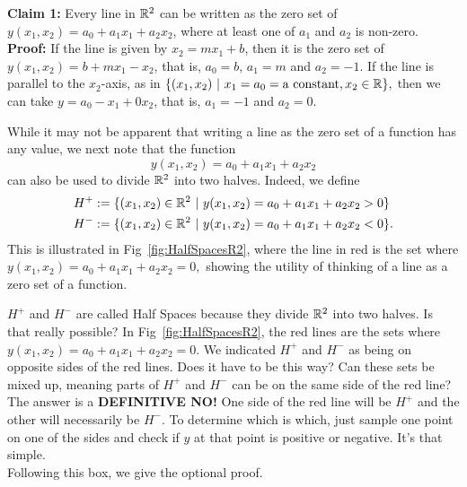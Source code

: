 
\textbf{Claim 1:} Every line in $\mathbb R^2$ can be written as the zero set of $y(x_1,x_2)=a_0 + a_1 x_1 + a_2 x_2$, where at least one of $a_1$ and $a_2$ is non-zero.\\

\textbf{Proof:} If the line is given by $x_2 = m x_1 + b$, then it is the zero set of $y(x_1,x_2)=b+m x_1 - x_2$, that is, $a_0=b$, $a_1=m$ and $a_2=-1.$ If the line is parallel to the $x_2$-axis, as in $ \{(x_1, x_2)~|~ x_1=a_0 = \text{a constant}, x_2 \in \mathbb R  \},$ 
then we can take  $y=a_0 - x_1 + 0 x_2$, that is,  $a_1=-1$ and $a_2=0.$
\Qed

\vspace*{0.2cm}

While it may not be apparent that writing a line as the zero set of a function has any value, we next note that the function  
$$y(x_1,x_2)=a_0 + a_1 x_1 + a_2 x_2$$
can also be used to divide $\mathbb R^2$ into two halves. Indeed, we define
\begin{align*}
H^+&:=\{(x_1, x_2) \in \mathbb R^2~|~ y(x_1,x_2) = a_0 + a_1 x_1 + a_2 x_2 >0\}\\
 H^-&:=\{(x_1, x_2) \in \mathbb R^2~|~ y(x_1,x_2) = a_0 + a_1 x_1 + a_2 x_2 <0\}.
\end{align*}
This is illustrated in Fig~\ref{fig:HalfSpacesR2}, where the line in red is the set where $y(x_1,x_2) = a_0 + a_1 x_1 + a_2 x_2 =0,$ showing the utility of thinking of a line as a zero set of a function.\\

\vspace*{.2cm}
\begin{tcolorbox}[sharp corners, colback=green!30, colframe=green!80!blue,title=\textbf{$H^+$ and $H^-$ are Called Half Spaces}]
$H^+$ and $H^-$ are called Half Spaces because they divide $\mathbb R^2$ into two halves. Is that really possible? In Fig~\ref{fig:HalfSpacesR2}, the red lines are the sets where $y(x_1,x_2) = a_0 + a_1 x_1 + a_2 x_2 =0$. We indicated $H^+$ and $H^-$ as being on opposite sides of the red lines. Does it have to be this way? Can these sets be mixed up, meaning parts of $H^+$ and $H^-$ can be on the same side of the red line? The answer is a \textbf{DEFINITIVE NO!} One side of the red line will be $H^+$ and the other will necessarily be $H^-$. To determine which is which, just sample one point on one of the sides and check if $y$ at that point is positive or negative. It's that simple. \\

Following this box, we give the optional proof. 
\end{tcolorbox}

